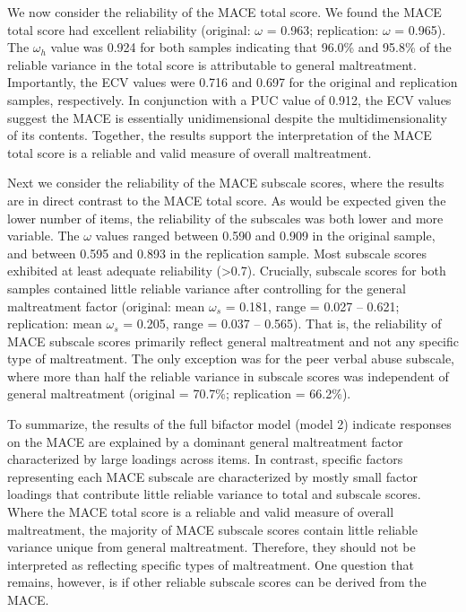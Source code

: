 \documentclass[letterpaper,man,natbib,noextraspace,floatsintext,longtable,12pt]{apa6}
\begin{document}
We now consider the reliability of the MACE total score. We found the MACE total score had excellent reliability (original: $\omega$ = 0.963; replication: $\omega$ = 0.965). The $\omega_h$ value was 0.924 for both samples indicating that 96.0\% and 95.8\% of the reliable variance in the total score is attributable to general maltreatment. Importantly, the ECV values were 0.716 and 0.697 for the original and replication samples, respectively. In conjunction with a PUC value of 0.912, the ECV values suggest the MACE is essentially unidimensional despite the multidimensionality of its contents. Together, the results support the interpretation of the MACE total score is a reliable and valid measure of overall maltreatment.

Next we consider the reliability of the MACE subscale scores, where the results are in direct contrast to the MACE total score. As would be expected given the lower number of items, the reliability of the subscales was both lower and more variable. The $\omega$ values ranged between 0.590 and 0.909 in the original sample, and between 0.595 and 0.893 in the replication sample. Most subscale scores exhibited at least adequate reliability (>0.7). Crucially, subscale scores for both samples contained little reliable variance after controlling for the general maltreatment factor (original: mean $\omega_s$ = 0.181, range = 0.027 -- 0.621; replication: mean $\omega_s$ = 0.205, range = 0.037 -- 0.565). That is, the reliability of MACE subscale scores primarily reflect general maltreatment and not any specific type of maltreatment. The only exception was for the peer verbal abuse subscale, where more than half the reliable variance in subscale scores was independent of general maltreatment (original = 70.7\%; replication = 66.2\%).

To summarize, the results of the full bifactor model (model 2) indicate responses on the MACE are explained by a dominant general maltreatment factor characterized by large loadings across items. In contrast, specific factors representing each MACE subscale are characterized by mostly small factor loadings that contribute little reliable variance to total and subscale scores. Where the MACE total score is a reliable and valid measure of overall maltreatment, the majority of MACE subscale scores contain little reliable variance unique from general maltreatment. Therefore, they should not be interpreted as reflecting specific types of maltreatment. One question that remains, however, is if other reliable subscale scores can be derived from the MACE. 
\end{document}
